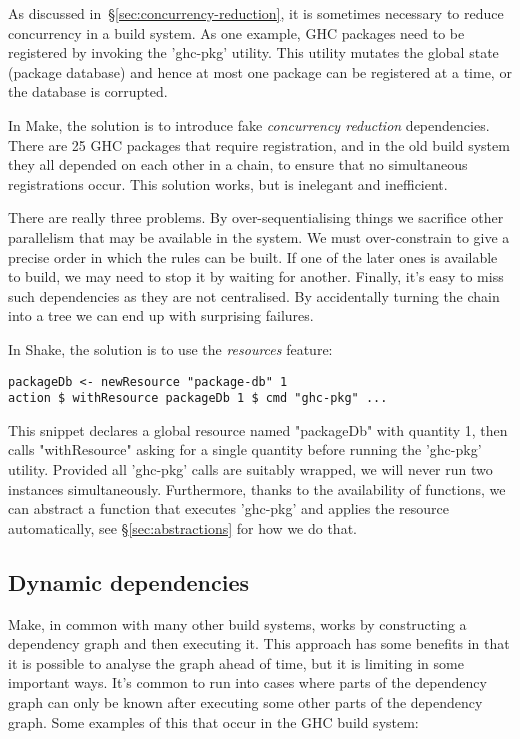 As discussed in~\S\ref{sec:concurrency-reduction}, it is sometimes necessary to
reduce concurrency in a build system. As one example, GHC packages need to
be registered by invoking the \lst'ghc-pkg' utility. This utility mutates the
global state (package database) and hence at most one package can be registered
at a time, or the database is corrupted. 

In Make, the solution is to introduce fake \emph{concurrency
reduction} dependencies. There are 25 GHC packages that require registration,
and in the old build system they all depended on each other in a chain, to
ensure that no simultaneous registrations occur. This solution works, but is
inelegant and inefficient.

There are really three problems. By over-sequentialising things we sacrifice
other parallelism that may be available in the system. We must over-constrain to
give a precise order in which the rules can be built. If one of the later ones
is available to build, we may need to stop it by waiting for another. Finally,
it's easy to miss such dependencies as they are not centralised. By accidentally
turning the chain into a tree we can end up with surprising failures.

In Shake, the solution is to use the \emph{resources} feature:

\begin{lstlisting}
packageDb <- newResource "package-db" 1
action $ withResource packageDb 1 $ cmd "ghc-pkg" ...
\end{lstlisting}

This snippet declares a global resource named \lst"packageDb" with quantity 1,
then calls \lst"withResource" asking for a single quantity before running the
\lst'ghc-pkg' utility. Provided all \lst'ghc-pkg' calls are suitably wrapped,
we will never run two instances simultaneously. Furthermore, thanks to the
availability of functions, we can abstract a function that executes
\lst'ghc-pkg' and applies the resource automatically, see
\S\ref{sec:abstractions} for how we do that.

\subsection{Dynamic dependencies\label{sec:dynamic-deps}}

Make, in common with many other build systems, works by
constructing a dependency graph and then executing it. This approach
has some benefits in that it is possible to analyse the graph ahead of
time, but it is limiting in some important ways.  It's common to run
into cases where parts of the dependency graph can only be known after
executing some other parts of the dependency graph.  Some examples of
this that occur in the GHC build system:

